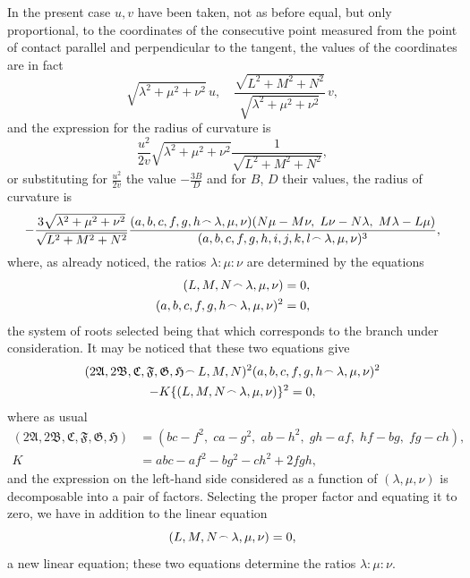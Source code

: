 \documentclass[11pt,a4paper]{article}
\theoremstyle{plain}
\begin{document}
In the present case $u, v$ have been taken, not as before equal, but only proportional, to the coordinates of the consecutive point measured from the point of contact parallel and perpendicular to the tangent, the values of the coordinates are in fact
\[
\sqrt{\lambda^2 + \mu^2 + \nu^2}\,u,\quad \frac{\sqrt{L^2 + M^2 + N^2}}{\sqrt{\lambda^2 + \mu^2 + \nu^2}}\,v,
\]
and the expression for the radius of curvature is
\[
\frac{u^2}{2v}\sqrt{\lambda^2 + \mu^2 + \nu^2}\frac{1}{\sqrt{L^2 + M^2 + N^2}},
\]
or substituting for $\frac{u^2}{2v}$ the value $-\frac{3B}{D}$ and for $B$, $D$ their values, the radius of curvature is
\[
-\frac{3\sqrt{\lambda^2 + \mu^2 + \nu^2}}{\sqrt{L^2 + M^2 + N^2}}\frac{(a, b, c, f, g, h \mathbin{\vcenter{\hbox{$\scriptstyle\!\frown$}}} \lambda, \mu, \nu)(N\mu - M\nu,\; L\nu - N\lambda,\; M\lambda - L\mu)}{(a, b, c, f, g, h, i, j, k, l \mathbin{\vcenter{\hbox{$\scriptstyle\!\frown$}}} \lambda, \mu, \nu)^3},
\]
where, as already noticed, the ratios $\lambda : \mu : \nu$ are determined by the equations
\begin{align*}
(L, M, N \mathbin{\vcenter{\hbox{$\scriptstyle\!\frown$}}} \lambda, \mu, \nu) &= 0,\\
(a, b, c, f, g, h \mathbin{\vcenter{\hbox{$\scriptstyle\!\frown$}}} \lambda, \mu, \nu)^2 &= 0,
\end{align*}
the system of roots selected being that which corresponds to the branch under consideration. It may be noticed that these two equations give
\begin{multline*}
(2\mathfrak{A}, 2\mathfrak{B}, \mathfrak{C}, \mathfrak{F}, \mathfrak{G}, \mathfrak{H} \mathbin{\vcenter{\hbox{$\scriptstyle\!\frown$}}} L, M, N)^2(a, b, c, f, g, h \mathbin{\vcenter{\hbox{$\scriptstyle\!\frown$}}} \lambda, \mu, \nu)^2\\
- K\{(L, M, N \mathbin{\vcenter{\hbox{$\scriptstyle\!\frown$}}} \lambda, \mu, \nu)\}^2 = 0,
\end{multline*}
where as usual
\begin{align*}
(2\mathfrak{A}, 2\mathfrak{B}, \mathfrak{C}, \mathfrak{F}, \mathfrak{G}, \mathfrak{H}) &= (bc - f^2,\; ca - g^2,\; ab - h^2,\; gh - af,\; hf - bg,\; fg - ch),\\
K &= abc - af^2 - bg^2 - ch^2 + 2fgh,
\end{align*}
and the expression on the left-hand side considered as a function of $(\lambda, \mu, \nu)$ is decomposable into a pair of factors. Selecting the proper factor and equating it to zero, we have in addition to the linear equation
\[
(L, M, N \mathbin{\vcenter{\hbox{$\scriptstyle\!\frown$}}} \lambda, \mu, \nu) = 0,
\]
a new linear equation; these two equations determine the ratios $\lambda : \mu : \nu$.
\end{document}
